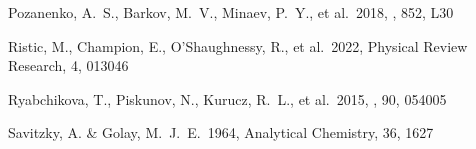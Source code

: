 \documentclass[twocolumn,twocolappendix]{aastex63}
\begin{document}
\begin{thebibliography}{}




 Pozanenko, A.~S., Barkov, M.~V., Minaev, P.~Y., et al.\ 2018, \apjl, 852, L30






 Ristic, M., Champion, E., O'Shaughnessy, R., et al.\ 2022, Physical Review Research, 4, 013046














 Ryabchikova, T., Piskunov, N., Kurucz, R.~L., et al.\ 2015, \physscr, 90, 054005




 Savitzky, A. \& Golay, M.~J.~E.\ 1964, Analytical Chemistry, 36, 1627





\end{thebibliography}
\end{document}
